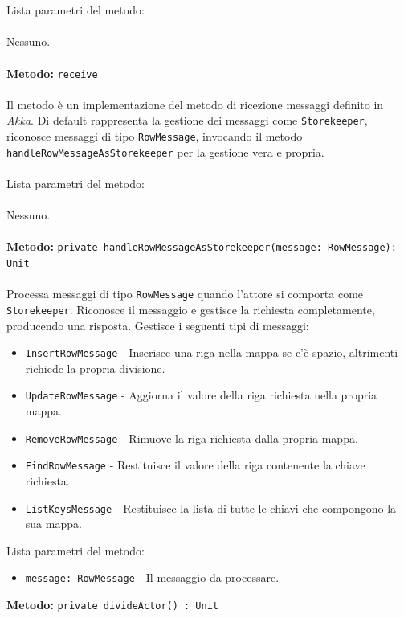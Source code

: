 \documentclass[a4paper]{article}
\begin{document}
			\\ \\
			Lista parametri del metodo:
			\\ \\
				Nessuno.
			\\ \\
		\textbf{Metodo: }\texttt{receive}
			\\ \\
			Il metodo è un implementazione del metodo di ricezione messaggi definito in \emph{Akka}. Di default rappresenta la gestione dei messaggi come \texttt{Storekeeper}, riconosce messaggi di tipo \texttt{RowMessage}, invocando il metodo \texttt{handleRowMessageAsStorekeeper} per la gestione vera e propria.
			\\ \\
			Lista parametri del metodo:
			\\ \\
			Nessuno.
			\\ \\
		\textbf{Metodo: }\texttt{private handleRowMessageAsStorekeeper(message: RowMessage): Unit}
			\\ \\
			Processa messaggi di tipo \texttt{RowMessage} quando l'attore si comporta come \texttt{Storekeeper}. Riconosce il messaggio e gestisce la richiesta completamente, producendo una risposta.
			Gestisce i seguenti tipi di messaggi:
			\begin{itemize}
				\item \texttt{InsertRowMessage} - Inserisce una riga nella mappa se c'è spazio, altrimenti richiede la propria divisione.
				\item \texttt{UpdateRowMessage} - Aggiorna il valore della riga richiesta nella propria mappa.
				\item \texttt{RemoveRowMessage} - Rimuove la riga richiesta dalla propria mappa.
				\item \texttt{FindRowMessage} - Restituisce il valore della riga contenente la chiave richiesta.
				\item \texttt{ListKeysMessage} - Restituisce la lista di tutte le chiavi che compongono la sua mappa.
			\end{itemize}
			Lista parametri del metodo:
			\begin{itemize}
				\item \texttt{message: RowMessage} - Il messaggio da processare.
			\end{itemize}
		\textbf{Metodo: }\texttt{private divideActor() : Unit}
\end{document}
